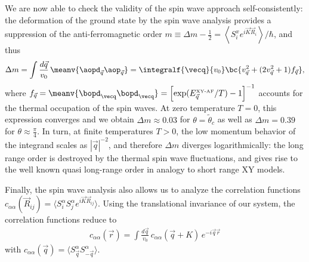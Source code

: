 We are now able to check the validity of the spin wave approach self-consistently: the deformation of the ground state by the spin wave analysis
provides a suppression of the anti-ferromagnetic order $ m \equiv  \Delta m - \frac{1}{2}=\left\langle S^x_i e^{i {\vec K} {\vec R_i}} \right\rangle / \hbar$,
and thus
%
\begin{align}
    \Delta m= \int \frac{d{\vec q}}{v_0} \, \meanv{ \aopd_{\vec q} \aop_{\vec q} } = \integralf{\vecq}{v_0}  \bc{ v_{\vec q}^2 + (2 v_{\vec q}^2 + 1) f_{\vec q} },
\end{align}
%
where $f_{\vec q} = \meanv{ \bopd_\vecq \bopd_\vecq } = \left[\exp(E^{\mbox{\tiny XY-AF}}_{\vec q}/ T)-1\right]^{-1}$ accounts for the thermal occupation of the spin waves. At zero temperature $T=0$, this expression converges and  we obtain $\Delta m \approx 0.03$ for $\theta = \tilde\theta_c$ as well as $\Delta m = 0.39$ for $\theta \approx \frac{\pi}{4}$. In turn, at finite temperatures $T>0$, the low momentum behavior of  the integrand scales as $|{\vec q}|^{-2}$, and therefore $\Delta m$ diverges logarithmically: the long range order is destroyed by the thermal spin wave fluctuations, and gives rise to the well known
quasi long-range order in analogy to short range XY models.

Finally, the spin wave analysis also allows us to analyze the correlation functions
 $c_{\alpha\alpha}({\vec R}_{ij})=\langle S^\alpha_i S^\alpha_{j} e^{i {\vec K} {\vec R}_{i j}} \rangle$. Using
 the translational invariance of our system, the correlation functions reduce to
%
\begin{align}
c_{\alpha\alpha}({\vec r}) = \int \frac{d{\vec q}}{v_0} \, c_{\alpha\alpha}({\vec q+K}) \, e^{-i {\vec q} {\vec r}}
\end{align}
%
with $c_{\alpha\alpha}({\vec q}) = \langle S^\alpha_{\vec q} S^\alpha_{-\vec{q}}\rangle$.
